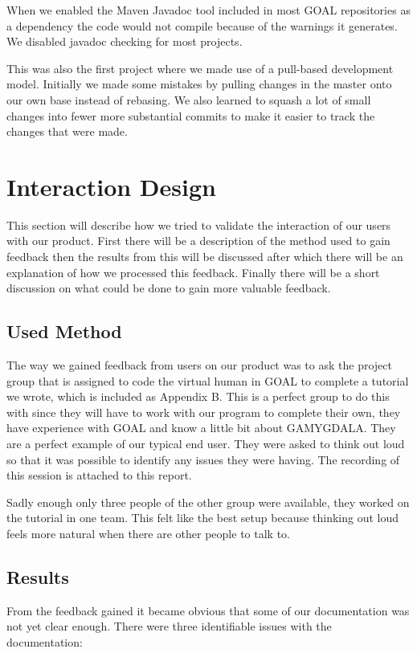 \documentclass[11pt]{article}
\begin{document}
When we enabled the Maven Javadoc tool included in most GOAL repositories as a dependency the code would not compile because of the warnings it generates. We disabled javadoc checking for most projects.\par
This was also the first project where we made use of a pull-based development model. Initially we made some mistakes by pulling changes in the master onto our own base instead of rebasing. We also learned to squash a lot of small changes into fewer more substantial commits to make it easier to track the changes that were made. 
\clearpage

\section{Interaction Design}
This section will describe how we tried to validate the interaction of our users with our product. First there will be a description of the method used to gain feedback then the results from this will be discussed after which there will be an explanation of how we processed this feedback. Finally there will be a short discussion on what could be done to gain more valuable feedback.

\subsection{Used Method}
The way we gained feedback from users on our product was to ask the project group that is assigned to code the virtual human in GOAL to complete a tutorial we wrote, which is included as Appendix B. This is a perfect group to do this with since they will have to work with our program to complete their own, they have experience with GOAL and know a little bit about GAMYGDALA. They are a perfect example of our typical end user. They were asked to think out loud so that it was possible to identify any issues they were having. The recording of this session is attached to this report.

Sadly enough only three people of the other group were available, they worked on the tutorial in one team. This felt like the best setup because thinking out loud feels more natural when there are other people to talk to.

\subsection{Results}
From the feedback gained it became obvious that some of our documentation was not yet clear enough. There were three identifiable issues with the documentation:
\end{document}
